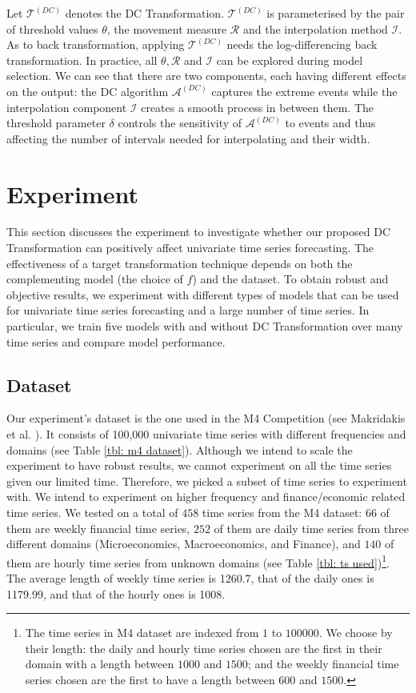 Let $\mathcal{T}^{(DC)}$ denotes the DC Transformation. $\mathcal{T}^{(DC)}$ is parameterised by the pair of threshold values $\theta$, the movement measure $\mathcal{R}$ and the interpolation method $\mathcal{I}$. As to back transformation, applying $\mathcal{T}^{(DC)}$ needs the log-differencing back transformation. In practice, all $\theta, \mathcal{R}$ and $\mathcal{I}$ can be explored during model selection. We can see that there are two components, each having different effects on the output: the DC algorithm $\mathcal{A}^{(DC)}$ captures the extreme events while the interpolation component $\mathcal{I}$ creates a smooth process in between them. The threshold parameter $\delta$ controls the sensitivity of $\mathcal{A}^{(DC)}$ to events and thus affecting the number of intervals needed for interpolating and their width.

\section{Experiment}\label{sec: experiment}
This section discusses the experiment to investigate whether our proposed DC Transformation can positively affect univariate time series forecasting. The effectiveness of a target transformation technique depends on both the complementing model (the choice of $f$) and the dataset. To obtain robust and objective results, we experiment with different types of models that can be used for univariate time series forecasting and a large number of time series. In particular, we train five models with and without DC Transformation over many time series and compare model performance.

\subsection{Dataset}
Our experiment's dataset is the one used in the M4 Competition (see Makridakis et al. \citeyear{MAKRIDAKIS202054}). It consists of 100,000 univariate time series with different frequencies and domains (see Table \ref{tbl: m4 dataset}). Although we intend to scale the experiment to have robust results, we cannot experiment on all the time series given our limited time. Therefore, we picked a subset of time series to experiment with. We intend to experiment on higher frequency and finance/economic related time series. We tested on a total of $458$ time series from the M4 dataset: $66$ of them are weekly financial time series, $252$ of them are daily time series from three different domains (Microeconomics, Macroeconomics, and Finance), and $140$ of them are hourly time series from unknown domains (see Table \ref{tbl: ts used})\footnote{The time series in M4 dataset are indexed from $1$ to $100000$. We choose by their length: the daily and hourly time series chosen are the first in their domain with a length between $1000$ and $1500$; and the weekly financial time series chosen are the first to have a length between $600$ and $1500$.}. The average length of weekly time series is 1260.7, that of the daily ones is 1179.99, and that of the hourly ones is 1008.

